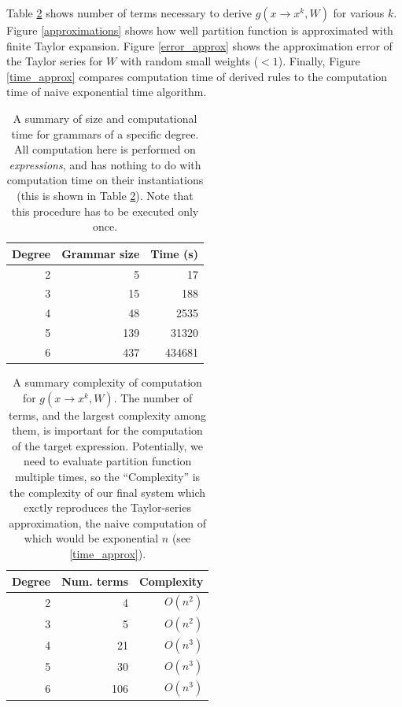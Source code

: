 Table \ref{eval} shows number of terms necessary to derive $g(x
\rightarrow x^k, W)$ for various $k$. Figure \ref{approximations}
shows how well partition function is approximated with finite Taylor
expansion. Figure \ref{error_approx} shows the approximation error of
the Taylor series for $W$ with random small weights ($<1$). Finally,
Figure \ref{time_approx} compares computation time of derived rules to
the computation time of naive exponential time algorithm.

\begin{table}
\tiny
\centering
\begin{tabular}{rrr}
\hline
Degree & Grammar size & Time (s) \\
\hline
2 & 5 & 17 \\
3 & 15 & 188 \\
4 & 48 & 2535\\
5 & 139 & 31320 \\
6 & 437 & 434681 \\
\hline
\end{tabular}
\caption{A summary of size and computational time for grammars of a specific degree. 
  All computation here is performed on {\em expressions}, and has
  nothing to do with computation time on their instantiations (this is
  shown in Table \ref{eval}). Note that this procedure has to be executed only once.}
\label{grammars}
\vspace{-4mm}
\end{table}

\begin{table}
\tiny
\centering
\begin{tabular}{rrr}
\hline
Degree & Num. terms & Complexity \\
\hline
2 & 4 & $O(n^2)$\\
3 & 5 & $O(n^2)$\\
4 & 21 & $O(n^3)$\\
5 & 30 & $O(n^3)$\\
6 & 106 & $O(n^3)$\\
\hline
\end{tabular}
\caption{A summary complexity of computation for $g(x \rightarrow x^k, W)$. 
  The number of terms, and the largest complexity among them, is important for the computation of the target expression.
  Potentially, we need to evaluate partition function multiple times, so the ``Complexity''
  is the complexity of our final system which exctly reproduces the
  Taylor-series approximation, the naive computation of which would be
  exponential $n$ (see \ref{time_approx}).} 
\label{eval}
\vspace{-4mm}
\end{table}


